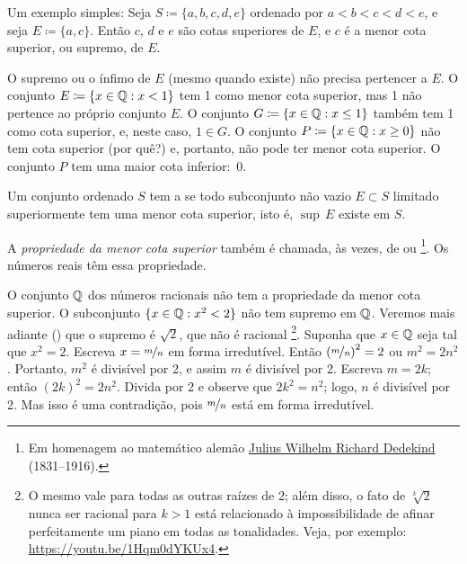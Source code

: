 Um exemplo simples:
Seja $S \coloneqq \{ a, b, c, d, e \}$ ordenado por $a < b < c < d < e$, e
seja $E \coloneqq \{ a, c \}$. Então $c$, $d$ e $e$ são cotas superiores de $E$, e
$c$ é a menor cota superior, ou supremo, de $E$.

O supremo ou o ínfimo de $E$ (mesmo quando existe) não precisa pertencer a
$E$. O conjunto $E \coloneqq \{ x \in {\mathbb{Q}} : x < 1 \}$ tem 1 como menor cota
superior, mas 1 não pertence ao próprio conjunto $E$.
O conjunto
$G \coloneqq \{ x \in {\mathbb{Q}} : x \leq 1 \}$ também tem 1 como cota superior,
e, neste caso, $1 \in G$.
O conjunto $P \coloneqq \{ x \in {\mathbb{Q}} : x \geq 0 \}$ não tem cota superior (por quê?) e, portanto,
não pode ter menor cota superior. O conjunto $P$ tem uma maior cota
inferior:~0.

\begin{defn} \label{defn:lub}
Um conjunto ordenado $S$ tem a \emph{} se
todo subconjunto não vazio
$E \subset S$ limitado superiormente tem uma menor cota superior, isto é,
$\sup\, E$ existe em $S$.
\end{defn}

A \emph{propriedade da menor cota superior}
também é chamada, às vezes, de \emph{} ou
\emph{}%
\footnote{%
Em homenagem ao matemático alemão
\href{https://en.wikipedia.org/wiki/Richard_Dedekind}{Julius Wilhelm Richard Dedekind}
(1831--1916).}.
Os números reais têm essa propriedade.

\begin{example}
O conjunto ${\mathbb{Q}}$ dos números racionais não tem a propriedade da menor cota superior. O subconjunto
$\{ x \in {\mathbb{Q}} : x^2 < 2 \}$ não tem supremo em ${\mathbb{Q}}$. Veremos mais adiante () que o supremo é
$\sqrt{2}$, que não é racional%
\footnote{O mesmo vale para todas as outras raízes de 2; além disso, o fato de
$\sqrt[k]{2}$ nunca ser racional para $k > 1$ está relacionado à
impossibilidade de afinar perfeitamente um piano em todas as tonalidades. Veja, por exemplo:
\url{https://youtu.be/1Hqm0dYKUx4}.}.
Suponha que $x \in {\mathbb{Q}}$ seja tal que $x^2 = 2$.
Escreva $x=\nicefrac{m}{n}$ em forma irredutível. Então ${(\nicefrac{m}{n})}^2 = 2$
ou
$m^2 = 2n^2$. Portanto, $m^2$ é divisível por 2, e assim $m$ é divisível por
2. Escreva $m = 2k$; então ${(2k)}^2 = 2n^2$. Divida por 2
e observe que $2k^2 = n^2$; logo, $n$ é divisível por 2. Mas isso é uma
contradição, pois $\nicefrac{m}{n}$ está em forma irredutível.
\end{example}

